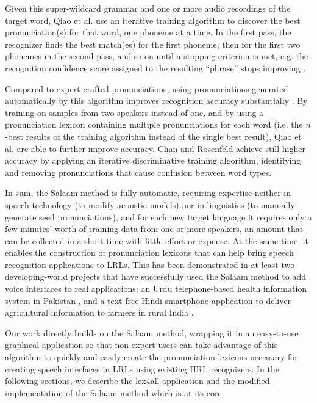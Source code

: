 \documentclass[11pt]{article}
\begin{document}
Given this super-wildcard grammar and one or more audio recordings of the target word, Qiao et al. \cite[§4.1]{Qiao10} use an iterative training algorithm to discover the best pronunciation(s) for that word, one phoneme at a time. 
In the first pass, the recognizer finds the best match(es) for the first phoneme, then for the first two phonemes in the second pass, and so on until a stopping criterion is met, e.g. the recognition confidence score assigned to the resulting ``phrase'' stops improving \cite[p.~4]{Qiao10}.

Compared to expert-crafted pronunciations, using pronunciations generated automatically by this algorithm improves recognition accuracy substantially \cite[§5.2]{Qiao10}. By training on samples from two speakers instead of one, and by using a pronunciation lexicon containing multiple pronunciations for each word (i.e. the $n$-best results of the training algorithm instead of the single best result), Qiao et al. are able to further improve accuracy. Chan and Rosenfeld \cite{Chan12} achieve still higher accuracy by applying an iterative discriminative training algorithm, identifying and removing pronunciations that cause confusion between word types.

In sum, the Salaam method is fully automatic, requiring expertise neither in speech technology (to modify acoustic models) nor in linguistics (to manually generate seed pronunciations), and for each new target language it requires only a few minutes' worth of training data from one or more speakers, an amount that can be collected in a short time with little effort or expense. At the same time, it enables the construction of pronunciation lexicons that can help bring speech recognition applications to LRLs. This has been demonstrated in at least two developing-world projects that have successfully used the Salaam method to add voice interfaces to real applications: an Urdu telephone-based health information system in Pakistan \cite{Sherwani09}, and a text-free Hindi smartphone application to deliver agricultural information to farmers in rural India \cite{bali13}.


Our work directly builds on the Salaam method, wrapping it in an easy-to-use graphical application so that non-expert users can take advantage of this algorithm to quickly and easily create the pronunciation lexicons necessary for creating speech interfaces in LRLs using existing HRL recognizers. In the following sections, we describe the lex4all application and the modified implementation of the Salaam method which is at its core.
\end{document}
